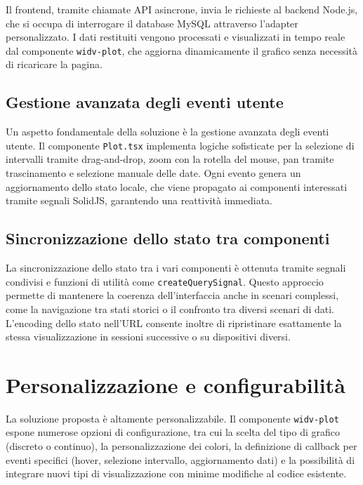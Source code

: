 Il frontend, tramite chiamate API asincrone, invia le richieste al backend Node.js, che si occupa di interrogare il database MySQL attraverso l’adapter personalizzato. I dati restituiti vengono processati e visualizzati in tempo reale dal componente \texttt{widv-plot}, che aggiorna dinamicamente il grafico senza necessità di ricaricare la pagina.

\subsection{Gestione avanzata degli eventi utente}

Un aspetto fondamentale della soluzione è la gestione avanzata degli eventi utente. Il componente \texttt{Plot.tsx} implementa logiche sofisticate per la selezione di intervalli tramite drag-and-drop, zoom con la rotella del mouse, pan tramite trascinamento e selezione manuale delle date. Ogni evento genera un aggiornamento dello stato locale, che viene propagato ai componenti interessati tramite segnali SolidJS, garantendo una reattività immediata.

\subsection{Sincronizzazione dello stato tra componenti}

La sincronizzazione dello stato tra i vari componenti è ottenuta tramite segnali condivisi e funzioni di utilità come \texttt{createQuerySignal}. Questo approccio permette di mantenere la coerenza dell’interfaccia anche in scenari complessi, come la navigazione tra stati storici o il confronto tra diversi scenari di dati. L’encoding dello stato nell’URL consente inoltre di ripristinare esattamente la stessa visualizzazione in sessioni successive o su dispositivi diversi.

\section{Personalizzazione e configurabilità}

La soluzione proposta è altamente personalizzabile. Il componente \texttt{widv-plot} espone numerose opzioni di configurazione, tra cui la scelta del tipo di grafico (discreto o continuo), la personalizzazione dei colori, la definizione di callback per eventi specifici (hover, selezione intervallo, aggiornamento dati) e la possibilità di integrare nuovi tipi di visualizzazione con minime modifiche al codice esistente.


